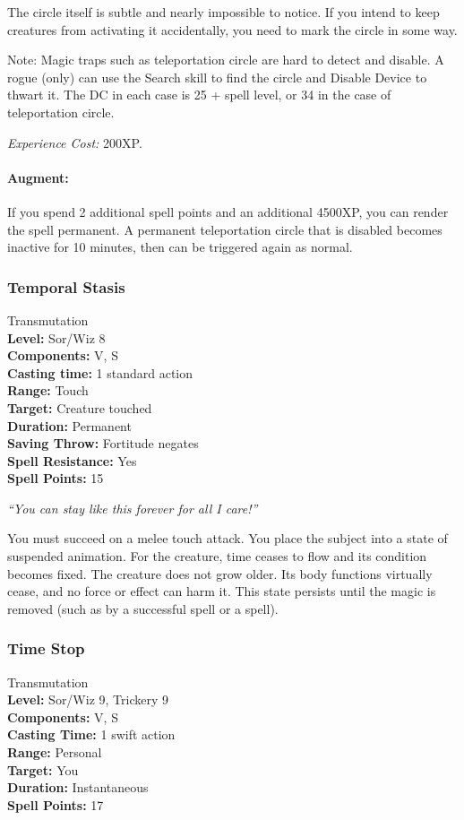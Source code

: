 The circle itself is subtle and nearly impossible to notice. 
If you intend to keep creatures from activating it accidentally, you need to mark the circle in some way.

Note: Magic traps such as teleportation circle are hard to detect and disable. 
A rogue (only) can use the Search skill to find the circle and Disable Device to thwart it. 
The DC in each case is 25 + spell level, or 34 in the case of teleportation circle. 

\emph{Experience Cost:} 200XP.

\paragraph{Augment:} If you spend 2 additional spell points and an additional 4500XP, you can render the spell permanent.
A permanent teleportation circle that is disabled becomes inactive for 10 minutes, then can be triggered again as normal.
\subsubsection{Temporal Stasis}
\label{Spell:TemporalStasis}
Transmutation
\\ \textbf{Level:} Sor/Wiz 8
\\ \textbf{Components:} V, S
\\ \textbf{Casting time:} 1 standard action
\\ \textbf{Range:} Touch
\\ \textbf{Target:} Creature touched
\\ \textbf{Duration:} Permanent
\\ \textbf{Saving Throw:} Fortitude negates
\\ \textbf{Spell Resistance:} Yes
\\ \textbf{Spell Points:} 15

\emph{``You can stay like this forever for all I care!''}

You must succeed on a melee touch attack. 
You place the subject into a state of suspended animation. 
For the creature, time ceases to flow and its condition becomes fixed. 
The creature does not grow older. 
Its body functions virtually cease, and no force or effect can harm it. 
This state persists until the magic is removed 
(such as by a successful  spell or a  spell).
\subsubsection{Time Stop}
\label{Spell:TimeStop}
Transmutation
\\ \textbf{Level:} Sor/Wiz 9, Trickery 9
\\ \textbf{Components:} V, S
\\ \textbf{Casting Time:} 1 swift action
\\ \textbf{Range:} Personal
\\ \textbf{Target:} You
\\ \textbf{Duration:} Instantaneous
\\ \textbf{Spell Points:} 17

